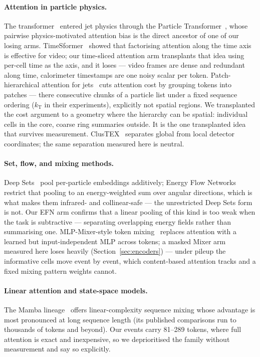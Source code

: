 \documentclass[11pt,a4paper]{article}
\begin{document}
\paragraph{Attention in particle physics.}
The transformer~\cite{vaswani} entered jet physics through the Particle
Transformer~\cite{part}, whose pairwise physics-motivated attention bias is
the direct ancestor of one of our losing arms.
TimeSformer~\cite{timesformer} showed that factorising attention along the
time axis is effective for video; our time-sliced attention arm transplants that idea
using per-cell time as the axis, and it loses --- video frames are dense and
redundant along time, calorimeter timestamps are one noisy scalar per token.
Patch-hierarchical attention for jets~\cite{patchjets} cuts attention cost
by grouping tokens into patches --- there consecutive chunks of a
particle list under a fixed sequence ordering ($k_\mathrm{T}$ in their
experiments), explicitly not spatial
regions. We
transplanted the cost argument to a geometry where the hierarchy can be
spatial: individual cells in the core, coarse ring summaries outside. It is
the one transplanted idea that survives measurement.
ClusTEX~\cite{clustex} separates global from local detector coordinates; the
same separation measured here is neutral.

\paragraph{Set, flow, and mixing methods.}
Deep Sets~\cite{deepsets} pool per-particle embeddings additively; Energy
Flow Networks~\cite{efn} restrict that pooling to an energy-weighted sum
over angular directions, which is what makes them infrared- and
collinear-safe --- the unrestricted Deep Sets form is not. Our EFN arm
confirms that a linear pooling of this kind is too weak when the task is
subtractive --- separating overlapping
energy fields rather than summarising one. MLP-Mixer-style token
mixing~\cite{mixer} replaces attention with a learned but
input-independent MLP across tokens; a masked Mixer arm measured here loses heavily
(Section~\ref{sec:encoders}) --- under pileup the informative cells move
event by event, which content-based attention tracks and a fixed mixing pattern
weights cannot.

\paragraph{Linear attention and state-space models.}
The Mamba lineage~\cite{mamba} offers linear-complexity sequence mixing whose
advantage is most pronounced at long sequence length (its published
comparisons run to thousands of tokens and beyond). Our events carry 81--289 tokens, where full attention
is exact and inexpensive, so we deprioritised the family without measurement and
say so explicitly.
\end{document}
